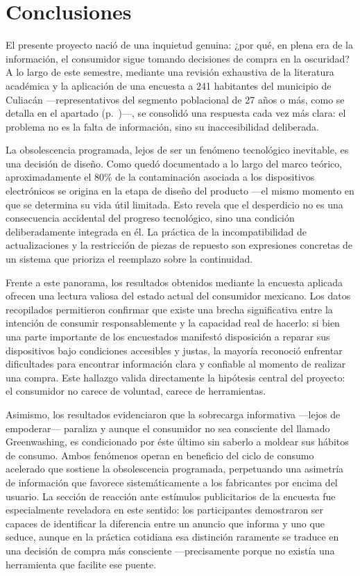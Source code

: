 \section{Conclusiones}

El presente proyecto nació de una inquietud genuina: ¿por qué, en plena era de
la información, el consumidor sigue tomando decisiones de compra en la
oscuridad? A lo largo de este semestre, mediante una revisión exhaustiva de la
literatura académica y la aplicación de una encuesta a 241 habitantes del
municipio de Culiacán —representativos del segmento poblacional de 27 años o
más, como se detalla en el apartado 
(p.~\pageref{sec:muestra})—, se consolidó una respuesta cada vez más clara: el
problema no es la falta de información, sino su inaccesibilidad deliberada.

La obsolescencia programada, lejos de ser un fenómeno tecnológico inevitable, es
una decisión de diseño. Como quedó documentado a lo largo del marco teórico,
aproximadamente el 80\% de la contaminación asociada a los dispositivos
electrónicos se origina en la etapa de diseño del producto —el mismo momento en
que se determina su vida útil limitada. Esto revela que el desperdicio no es una
consecuencia accidental del progreso tecnológico, sino una condición
deliberadamente integrada en él. La práctica de la incompatibilidad de
actualizaciones y la restricción de piezas de repuesto son expresiones concretas
de un sistema que prioriza el reemplazo sobre la continuidad. 

Frente a este panorama, los resultados obtenidos mediante la encuesta aplicada
ofrecen una lectura valiosa del estado actual del consumidor mexicano. Los datos
recopilados permitieron confirmar que existe una brecha significativa entre la
intención de consumir responsablemente y la capacidad real de hacerlo: si bien
una parte importante de los encuestados manifestó disposición a reparar sus
dispositivos bajo condiciones accesibles y justas, la mayoría reconoció
enfrentar dificultades para encontrar información clara y confiable al momento
de realizar una compra. Este hallazgo valida directamente la hipótesis central
del proyecto: el consumidor no carece de voluntad, carece de herramientas. 

Asimismo, los resultados evidenciaron que la sobrecarga informativa —lejos de
empoderar— paraliza y aunque el consumidor no sea consciente del llamado
Greenwashing, es condicionado por éste último sin saberlo a moldear sus
hábitos de consumo. Ambos fenómenos operan en beneficio del ciclo de consumo
acelerado que sostiene la obsolescencia programada, perpetuando una asimetría de
información que favorece sistemáticamente a los fabricantes por encima del
usuario. La sección de reacción ante estímulos publicitarios de la encuesta fue
especialmente reveladora en este sentido: los participantes demostraron ser
capaces de identificar la diferencia entre un anuncio que informa y uno que
seduce, aunque en la práctica cotidiana esa distinción raramente se traduce en
una decisión de compra más consciente —precisamente porque no existía una
herramienta que facilite ese puente. 

